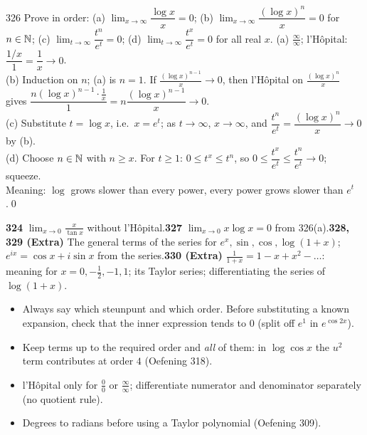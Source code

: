 \begin{bookex}{326}
Prove in order: (a) $\lim_{x\to\infty}\dfrac{\log x}x=0$; (b) $\lim_{x\to\infty}\dfrac{(\log x)^n}x=0$ for $n\in\mathbb{N}$; (c) $\lim_{t\to\infty}\dfrac{t^n}{e^t}=0$; (d) $\lim_{t\to\infty}\dfrac{t^x}{e^t}=0$ for all real $x$.
\solution
(a) $\frac\infty\infty$; l'H\^opital: $\dfrac{1/x}1=\dfrac1x\to0$.\\
(b) Induction on $n$; (a) is $n=1$. If $\frac{(\log x)^{n-1}}x\to0$, then l'H\^opital on $\frac{(\log x)^n}x$ gives $\dfrac{n(\log x)^{n-1}\cdot\frac1x}1=n\dfrac{(\log x)^{n-1}}x\to0$.\\
(c) Substitute $t=\log x$, i.e.\ $x=e^t$; as $t\to\infty$, $x\to\infty$, and $\dfrac{t^n}{e^t}=\dfrac{(\log x)^n}x\to0$ by (b).\\
(d) Choose $n\in\mathbb{N}$ with $n\ge x$. For $t\ge1$: $0\le t^x\le t^n$, so $0\le\dfrac{t^x}{e^t}\le\dfrac{t^n}{e^t}\to0$; squeeze.\\
Meaning: $\log$ grows slower than every power, every power grows slower than $e^t$.\qed
\end{bookex}

\begin{trybox}[{324, 327, 328, 329, 330 (Extra)}]
\textbf{324} $\lim_{x\to0}\frac x{\tan x}$ without l'H\^opital.\quad \textbf{327} $\lim_{x\to0}x\log x=0$ from 326(a).\quad \textbf{328, 329 (Extra)} The general terms of the series for $e^x,\sin,\cos,\log(1+x)$; $e^{ix}=\cos x+i\sin x$ from the series.\quad \textbf{330 (Extra)} $\frac1{1+x}=1-x+x^2-\dots$: meaning for $x=0,-\frac12,-1,1$; its Taylor series; differentiating the series of $\log(1+x)$.
\end{trybox}

\begin{warn}
\begin{itemize}
\item Always say which steunpunt and which order. Before substituting a known expansion, check that the inner expression tends to $0$ (split off $e^{1}$ in $e^{\cos2x}$).
\item Keep terms up to the required order and \emph{all} of them: in $\log\cos x$ the $u^2$ term contributes at order $4$ (Oefening 318).
\item l'H\^opital only for $\frac00$ or $\frac\infty\infty$; differentiate numerator and denominator separately (no quotient rule).
\item Degrees to radians before using a Taylor polynomial (Oefening 309).
\end{itemize}
\end{warn}
